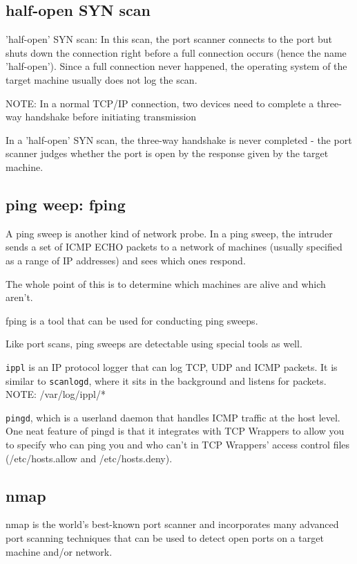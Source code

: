 \subsection{half-open SYN scan}

 'half-open' SYN scan:  In this scan, the port scanner connects to the port but
 shuts down the connection right before a full connection occurs (hence the name
 'half-open').  Since a full connection never happened, the operating system of
 the target machine usually does not log the scan.
 
 NOTE:  In a normal TCP/IP connection, two devices need to complete a three-way
 handshake before initiating transmission
 
 In a 'half-open' SYN scan, the three-way handshake is never completed - the port
 scanner judges whether the port is open by the response given by the target machine.
 
\subsection{ping weep: fping}

A ping sweep is another kind of network probe. In a ping sweep, the intruder
sends a set of ICMP ECHO packets to a network of machines (usually specified as
a range of IP addresses) and sees which ones respond.  

The whole point of this is to determine which machines are alive and which
aren't. 

fping is a tool that can be used for conducting ping sweeps. 

Like port scans, ping sweeps are detectable using special tools as well. 

\verb!ippl! is an IP protocol logger that can log TCP, UDP and ICMP packets. It
is similar to \verb!scanlogd!, where it sits in the background and listens for
packets. NOTE: /var/log/ippl/*
 
\verb!pingd!, which is a userland daemon that handles ICMP traffic at the host
level. One neat feature of pingd is that it integrates with TCP Wrappers to allow you
 to specify who can ping you and who can't in TCP Wrappers' access control files
 (/etc/hosts.allow and /etc/hosts.deny).  
 
 
\subsection{nmap}
\label{sec:nmap}


nmap is the world's best-known port scanner and incorporates many advanced port
scanning techniques that can be used to detect open ports on a target machine
and/or network. 

